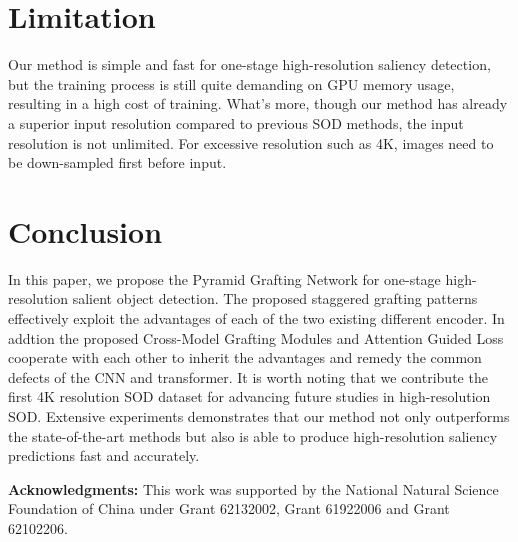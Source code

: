 \documentclass[10pt,twocolumn,letterpaper]{article}
\begin{document}
\section{Limitation}
Our method is simple and fast for one-stage high-resolution saliency detection, but the training process is still quite demanding on GPU memory usage, resulting in a high cost of training. What's more, though our method has already a superior input resolution compared to previous SOD methods, the input resolution is not unlimited. For excessive resolution such as 4K, images need to be down-sampled first before input.


\section{Conclusion}
In this paper, we propose the Pyramid Grafting Network for one-stage high-resolution salient object detection. The proposed staggered grafting patterns effectively exploit the advantages of each of the two existing different encoder. In addtion the proposed Cross-Model Grafting Modules and Attention Guided Loss cooperate with each other to inherit the advantages and remedy the common defects of the CNN and transformer. It is worth noting that we contribute the first 4K resolution SOD dataset for advancing future studies in high-resolution SOD. Extensive experiments demonstrates that our method not only outperforms the state-of-the-art methods but also is able to produce high-resolution saliency predictions fast and accurately.


\noindent\textbf{Acknowledgments:} This work was supported by the National Natural Science Foundation of China under Grant 62132002, Grant 61922006 and Grant 62102206.





{\small


}
\end{document}
